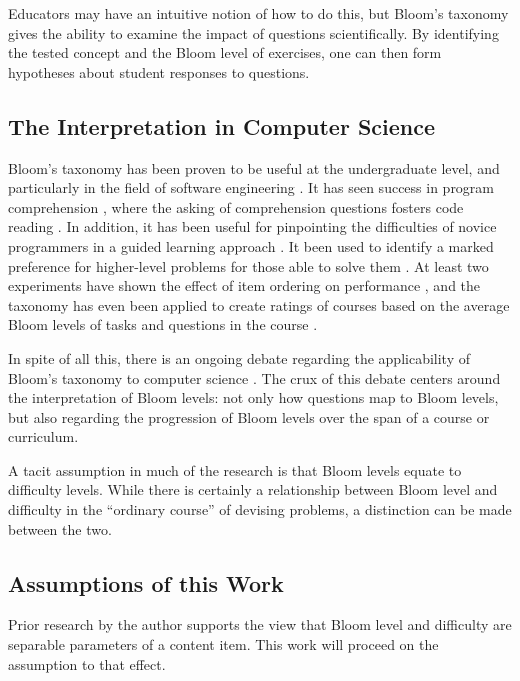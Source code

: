 Educators may have an intuitive notion of how to do this, but Bloom's taxonomy
gives the ability to examine the impact of questions scientifically.  By
identifying the tested concept and the Bloom level of exercises, one can then
form hypotheses about student responses to questions.  

\subsection{The Interpretation in Computer Science}

Bloom's taxonomy has been proven to be useful at the undergraduate level, and
particularly in the field of software engineering \cite{britto2015,
mahmood2014}.  It has seen success in program comprehension
\cite{buckley2003}, where the asking of comprehension questions fosters code
reading \cite{losada2008}. In addition, it has been useful for pinpointing the
difficulties of novice programmers in a guided learning approach
\cite{shuhidan2011}.  It been used to identify a marked preference for
higher-level problems for those able to solve them \cite{bruyn2011}
\cite{goel2004}.  At least two experiments have shown the effect of item
ordering on performance \cite{newman1988effect,castleberry2016effect}, and the
taxonomy has even been applied to create ratings of courses based on the
average Bloom levels of tasks and questions in the course
\cite{oliver2004course}.

In spite of all this, there is an ongoing debate regarding the applicability of
Bloom's taxonomy to computer science \cite{johnson2006bloom,
fuller2007developing, thompson2008bloom}.  The crux of this debate centers
around the interpretation of Bloom levels: not only how questions map to Bloom
levels, but also regarding the progression of Bloom levels over the span of a
course or curriculum.  

A tacit assumption in much of the research is that Bloom levels equate to
difficulty levels.  While there is certainly a relationship between Bloom level
and difficulty in the ``ordinary course'' of devising problems, a distinction
can be made between the two.

\subsection{Assumptions of this Work}

Prior research by the author supports the view that Bloom level and difficulty
are separable parameters of a content item.  This work will proceed on the
assumption to that effect. 

